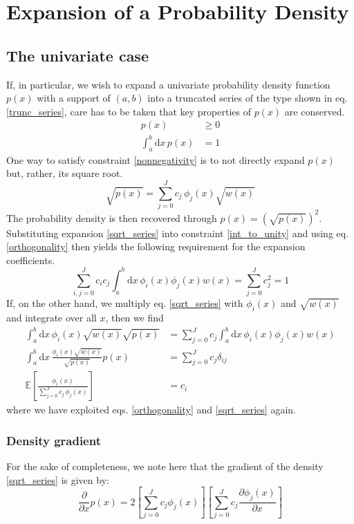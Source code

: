 \documentclass[]{report}
\begin{document}
\chapter{Expansion of a Probability Density}
	\section{The univariate case}
	If, in particular, we wish to expand a univariate probability density function $p(x)$ with a support of $(a,b)$ into a truncated series of the type shown in eq. \ref{trunc_series}, care has to be taken that key properties of $p(x)$ are conserved.
	\begin{align}
		p(x) & \ge 0 \label{nonnegativity}\\
		\int_a^b\mathrm{d}x\,p(x) & = 1 \label{int_to_unity}
	\end{align}	
	One way to satisfy constraint \ref{nonnegativity} is to not directly expand $p(x)$ but, rather, its square root.
	\begin{equation}\label{sqrt_series}
		\sqrt{p(x)} = \sum_{j=0}^{J}c_j\,\phi_j(x)\sqrt{w(x)}
	\end{equation}
	The probability density is then recovered through $p(x)=\left(\sqrt{p(x)}\right)^2$. Substituting expansion \ref{sqrt_series} into constraint \ref{int_to_unity} and using eq. \ref{orthogonality} then yields the following requirement for the expansion coefficients.
	\begin{equation}\label{coeff_sqr_norm}
		\sum_{i, j=0}^{J}c_ic_j\int_a^b\mathrm{d}x\,\phi_i(x)\phi_j(x)w(x) = \sum_{j=0}^{J}c_j^2 = 1
	\end{equation}
	If, on the other hand,  we multiply eq. \ref{sqrt_series} with $\phi_i(x)$ and $\sqrt{w(x)}$ and integrate over all $x$, then we find
	\begin{align}
		\int_a^b\mathrm{d}x\,\phi_i(x)\sqrt{w(x)}\sqrt{p(x)} & = \sum_{j=0}^{J}c_j\int_a^b\mathrm{d}x\,\phi_i(x)\phi_j(x)w(x) \nonumber \\ 
		\int_a^b\mathrm{d}x\,\frac{\phi_i(x)\sqrt{w(x)}}{\sqrt{p(x)}}p(x) & = \sum_{j=0}^{J}c_j\delta_{ij} \\
		\mathbb{E}\left[\frac{\phi_i(x)}{\sum_{j=0}^{J}c_j\,\phi_j(x)}\right] & = c_i \nonumber
	\end{align}
	where we have exploited eqs. \ref{orthogonality} and \ref{sqrt_series} again.
	
		\subsection{Density gradient}
		For the sake of completeness, we note here that the gradient of the density \ref{sqrt_series} is given by:
		\begin{equation}
			\frac{\partial}{\partial x}p(x) = 2\left[\sum_{j=0}^Jc_j\phi_j(x)\right]\left[\sum_{j=0}^Jc_j\frac{\partial\phi_j(x)}{\partial x}\right]
		\end{equation}
	
\end{document}
